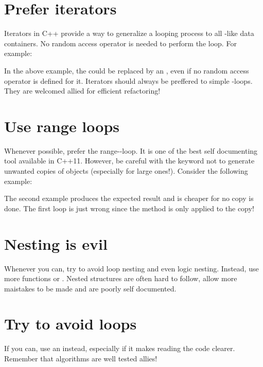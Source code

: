 \section{Prefer iterators}
Iterators in C++ provide a way to generalize a looping process to all 
-like data containers. No random access operator is needed to perform 
the loop. For example:


In the above example, the  could be replaced by an 
, even if no random access operator is defined for it. Iterators 
should always be preffered to simple -loops. They are welcomed allied 
for efficient refactoring!

\section{Use range  loops}
Whenever possible, prefer the range--loop. It is one of the best self 
documenting tool available in C++11. However, be careful with the keyword 
 not to generate unwanted copies of objects (especially for large 
ones!). Consider the following example:


The second example produces the expected result and is cheaper for no copy is 
done. The first loop is just wrong since the  method is only 
applied to the copy!

\section{Nesting is evil}
Whenever you can, try to avoid loop nesting and even logic nesting. Instead, 
use more functions or . Nested structures are often hard 
to follow, allow more maistakes to be made and are poorly self documented.

\section{Try to avoid loops}
If you can, use an  instead, especially if it makes reading 
the code clearer. Remember that algorithms are well tested allies!